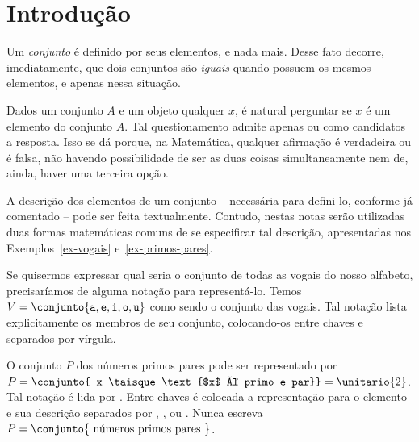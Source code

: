 \section{Introdução}
\label{sec:intro}

Um \emph{conjunto} é definido por seus elementos, e nada mais.
Desse fato decorre, imediatamente, que dois conjuntos são \emph{iguais} quando possuem os mesmos elementos, e apenas nessa situação. 

Dados um conjunto $A$ e um objeto qualquer $x$, é natural perguntar se $x$ é um elemento do conjunto $A$. Tal questionamento admite apenas  ou  como candidatos a resposta. Isso se dá porque, na Matemática, qualquer afirmação é verdadeira ou é falsa, não havendo possibilidade de ser as duas coisas simultaneamente nem de, ainda, haver uma terceira opção. 


A descrição dos elementos de um conjunto -- necessária para defini-lo, conforme já comentado -- pode ser feita textualmente. Contudo, nestas notas serão utilizadas duas formas matemáticas comuns de se especificar tal descrição, apresentadas nos Exemplos~\ref{ex-vogais} e~\ref{ex-primos-pares}. 

\begin{example}
    \label{ex-vogais}
    Se quisermos expressar qual seria o conjunto de todas as vogais do nosso alfabeto, precisaríamos de alguma notação para representá-lo. Temos $V = \conjunto{\texttt a, \texttt e, \texttt i, \texttt o, \texttt u}$ como sendo o conjunto das vogais. Tal notação lista explicitamente os membros de seu conjunto, colocando-os entre chaves e separados por vírgula.
\end{example}

\begin{example}
    \label{ex-primos-pares}
    O conjunto $P$ dos números primos pares pode ser representado por $P = \conjunto{ x \taisque \text{$x$ é primo e par}} = \unitario{2}$. Tal notação é lida por . Entre chaves é colocada a representação para o elemento e sua descrição separados por \entreaspas{;}, \entreaspas{\contrabarra}, ou \entreaspas{|}.  Nunca escreva $P = \conjunto{\text{ números primos pares }}$.
\end{example}
